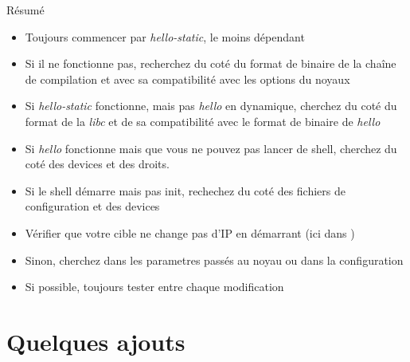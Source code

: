 \begin{frame}{Résumé}
  \begin{itemize}
  \item Toujours commencer par  \emph{hello-static}, le moins dépendant
  \item Si il ne fonctionne  pas, recherchez du coté du format de binaire
    de  la chaîne  de compilation  et avec  sa compatibilité  avec les
    options du noyaux
  \item  Si \emph{hello-static} fonctionne,  mais pas  \emph{hello} en
    dynamique, cherchez du coté du format de la \emph{libc} et de
    sa compatibilité avec le format de binaire de \emph{hello}
  \item Si \emph{hello} fonctionne mais  que vous ne pouvez pas lancer
    de shell, cherchez du coté des devices et des droits.
  \item Si le  shell démarre mais pas init, rechechez  du coté des
    fichiers de configuration et des devices
  \item Vérifier que votre cible  ne change pas d'IP en démarrant (ici
    dans )
  \item Sinon, cherchez dans les parametres passés au noyau ou dans la
    configuration
  \item Si possible, toujours tester entre chaque modification
  \end{itemize}
\end{frame}


\section{Quelques ajouts}

